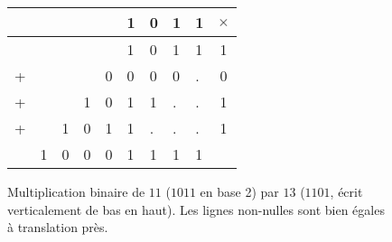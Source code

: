 \documentclass[11pt, openany]{article}
\begin{document}
\begin{figure}
\centering
\begin{tabular}{lllllllll|c}
&&&&&1&0&1&1&$\times$\\
\hline
&&&&&1&0&1&1&1\\
+&&&&0&0&0&0&.&0 \\
+&&&1&0&1&1&.&.&1\\
+&&1&0&1&1&.&.&.&1\\
\hline
&1&0&0&0&1&1&1&1&\\
\end{tabular}
\caption{Multiplication binaire de $11$ ($1011$ en base 2) par $13$ ($1101$, écrit verticalement de bas en haut). Les lignes non-nulles sont bien égales à translation près.}
\end{figure}
\end{document}
